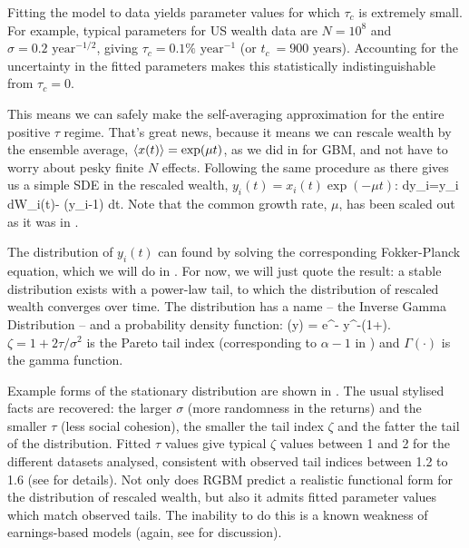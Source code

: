 Fitting the model to data yields parameter values for which $\tau_c$ is extremely small. For example, typical parameters for US wealth data are $N=10^8$ and $\sigma=0.2\text{ year}^{-1/2}$, giving $\tau_c = 0.1\%\text{ year}^{-1}$ (or $t_c\ = 900\text{ years}$). Accounting for the uncertainty in the fitted parameters makes this statistically indistinguishable from $\tau_c=0$.

This means we can safely make the self-averaging approximation for the entire positive $\tau$ regime. That's great news, because it means we can rescale wealth by the ensemble average, $\left\langle x(t) \right\rangle=\exp(\mu t)$, as we did in  for GBM, and not have to worry about pesky finite $N$ effects. Following the same procedure as there gives us a simple SDE in the rescaled wealth, $y_i(t) = x_i(t)\exp(-\mu t)$:
\be
dy_i=y_i \sigma dW_i\left(t\right)- \tau (y_i-1) dt.
\ee
Note that the common growth rate, $\mu$, has been scaled out as it was in .

The distribution of $y_i\left(t\right)$ can found by solving the corresponding Fokker-Planck equation, which we will do in . For now, we will just quote the result: a stable distribution exists with a power-law tail, to which the distribution of rescaled wealth converges over time. The distribution has a name -- the Inverse Gamma Distribution -- and a probability density function:
\be
{}\left(y\right) = \frac{\left(\zeta-1\right)^\zeta}{\Gamma\left(\zeta\right)} e^{-} y^{-\left(1+\zeta\right)}.
\ee
$\zeta=1+2\tau/\sigma^2$ is the Pareto tail index (corresponding to $\alpha-1$ in ) and $\Gamma\left(\cdot\right)$ is the gamma function.

Example forms of the stationary distribution are shown in . The usual stylised facts are recovered: the larger $\sigma$ (more randomness in the returns) and the smaller $\tau$ (less social cohesion), the smaller the tail index $\zeta$ and the fatter the tail of the distribution. Fitted $\tau$ values give typical $\zeta$ values between 1 and 2 for the different datasets analysed, consistent with observed tail indices between 1.2 to 1.6 (see \cite{BermanPetersAdamou2017} for details). Not only does RGBM predict a realistic functional form for the distribution of rescaled wealth, but also it admits fitted parameter values which match observed tails. The inability to do this is a known weakness of earnings-based models (again, see \cite{BermanPetersAdamou2017} for discussion).

